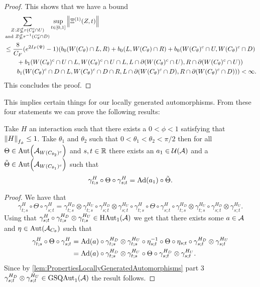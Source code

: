 \documentclass[12pt,a4paper,twoside]{article}
\numberwithin{equation}{section}
\begin{document}
\begin{proof}
	This shows that we have a bound
	\begin{align}
		&\sum_{\substack{Z:Z\nsubseteq \tau(C_\theta^c\cap U)\\\text{and }Z\nsubseteq \tau^{-1}(C_\theta^c\cap D)}}\sup_{t\in[0,1]}\norm{\Xi^{(1)}(Z,t)}\\
		\nonumber
		&\leq \frac{8}{C_F}(e^{2I_F(\Psi)}-1)(b_0(W(C_\theta)\cap L,R)+b_0(L,W(C_\theta)\cap R)+b_0(W(C_\theta)^c\cap U,W(C_\theta)^c\cap D)\\
		\nonumber
		&\qquad+b_1(W(C_\theta)^c\cap U\cap L,W(C_\theta)^c\cap U\cap L,L\cap\partial(W(C_\theta)^c\cap U),R\cap\partial(W(C_\theta)^c\cap U))\\
		&\qquad b_1(W(C_\theta)^c\cap D\cap L,W(C_\theta)^c\cap D\cap R,L\cap\partial(W(C_\theta)^c\cap D),R\cap\partial(W(C_\theta)^c\cap D)))<\infty.
	\end{align}
	This concludes the proof.
\end{proof}
This implies certain things for our locally generated automorphisms.
From these four statements we can prove the following results:
\begin{lemma}\label{lem:TwoAngleLemmaPart1}
	Take $H$ an interaction such that there exists a $0<\phi<1$ satisfying that $\norm{H}_{f_\phi}\leq 1$. Take $\theta_1$ and $\theta_2$ such that $0<\theta_1<\theta_2<\pi/2$ then for all $\Theta\in\Aut{\AA_{W(C_{\theta_2})^c}}$ and $s,t\in\RR$ there exists an $a_1\in\UU(\AA)$ and a $\tilde{\Theta}\in \Aut{\AA_{W(C_{\theta_1})^c}}$ such that
	\begin{equation}\label{eq:TwoAngleLemmaPart1Equation1}
		\gamma^{H}_{t;s}\circ\Theta\circ\gamma^{H}_{s;t}=\Ad{a_1}\circ\tilde{\Theta}.
	\end{equation}
\end{lemma}
\begin{proof}
	We have that
	\begin{equation}
		\gamma^{H}_{t;s}\circ\Theta\circ\gamma^{H}_{s;t}=\gamma^{H_D}_{t;s}\otimes\gamma^{H_U}_{t;s}\circ\gamma^{H_D}_{s;t}\otimes\gamma^{H_U}_{s;t}\circ\gamma^{H}_{t;s}\circ\Theta\circ\gamma^{H}_{s;t}\circ\gamma^{H_D}_{t;s}\otimes\gamma^{H_U}_{t;s}\circ\gamma^{H_D}_{s;t}\otimes\gamma^{H_U}_{s;t}.
	\end{equation}
	Using that $\gamma^{H}_{s;t}\circ\gamma^{H_D}_{t;s}\otimes\gamma^{H_U}_{t;s}\in\textrm{HAut}_1(\AA)$ we get that there exists some $a\in\AA$ and $\eta\in\Aut{\AA_{C_\theta}}$ such that
	\begin{align}
		\gamma^{H}_{t;s}\circ\Theta\circ\gamma^{H}_{s;t}&=\Ad{a}\circ \gamma^{H_D}_{t;s}\otimes\gamma^{H_U}_{t;s}\circ\eta_{s;t}^{-1}\circ\Theta\circ\eta_{s;t}\circ\gamma^{H_D}_{s;t}\otimes\gamma^{H_U}_{s;t}\\
		&=\Ad{a}\circ \gamma^{H_D}_{t;s}\otimes\gamma^{H_U}_{t;s}\circ\Theta\circ\gamma^{H_D}_{s;t}\otimes\gamma^{H_U}_{s;t}.
	\end{align}
	Since by \ref{lem:PropertiesLocallyGeneratedAutomorphisms} part 3 $\gamma^{H_D}_{s;t}\otimes\gamma^{H_U}_{s;t}\in\textrm{GSQAut}_1(\AA)$ the result follows.
\end{proof}
\end{document}
